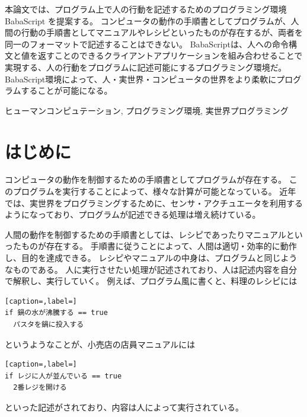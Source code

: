 \documentclass{deimj}
\begin{document}
\pagestyle{empty}
\begin{jabstract}
本論文では、プログラム上で人の行動を記述するためのプログラミング環境 BabaScript を提案する。
コンピュータの動作の手順書としてプログラムが、人間の行動の手順書としてマニュアルやレシピといったものが存在するが、両者を同一のフォーマットで記述することはできない。
BabaScriptは、人への命令構文と値を返すことのできるクライアントアプリケーションを組み合わせることで実現する、人の行動をプログラムに記述可能にするプログラミング環境だ。
BabaScript環境によって、人・実世界・コンピュータの世界をより柔軟にプログラムすることが可能になる。
\end{jabstract}
\begin{jkeyword}
ヒューマンコンピュテーション, プログラミング環境, 実世界プログラミング
\end{jkeyword}
\maketitle

\section{はじめに}

コンピュータの動作を制御するための手順書としてプログラムが存在する。
このプログラムを実行することによって、様々な計算が可能となっている。
近年では、実世界をプログラミングするために、センサ・アクチュエータを利用するようになっており、プログラムが記述できる処理は増え続けている。

人間の動作を制御するための手順書としては、レシピであったりマニュアルといったものが存在する。
手順書に従うことによって、人間は適切・効率的に動作し、目的を達成できる。
レシピやマニュアルの中身は、プログラムと同じようなものである。
人に実行させたい処理が記述されており、人は記述内容を自分で解釈し、実行していく。
例えば、プログラム風に書くと、料理のレシピには

\begin{lstlisting}[caption=,label=]
if 鍋の水が沸騰する == true
  パスタを鍋に投入する
\end{lstlisting}
    
というようなことが、小売店の店員マニュアルには

\begin{lstlisting}[caption=,label=]
if レジに人が並んでいる == true
  2番レジを開ける
\end{lstlisting}
    
といった記述がされており、内容は人によって実行されている。
\end{document}
